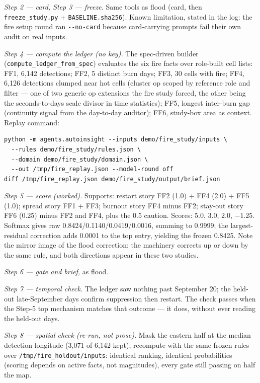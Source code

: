 \documentclass[11pt]{article}
\begin{document}
\emph{Step 2 --- card, Step 3 --- freeze.} Same tools as flood (card, then
\verb|freeze_study.py| + \verb|BASELINE.sha256|). Known limitation, stated in
the log: the fire setup round ran \verb|--no-card| because card-carrying
prompts fail their own audit on real inputs.

\emph{Step 4 --- compute the ledger (no key).} The spec-driven builder
(\verb|compute_ledger_from_spec|) evaluates the six fire facts over
role-built cell lists: FF1, 6,142 detections; FF2, 5 distinct burn days; FF3,
30 cells with fire; FF4, 6,126 detections clumped near hot cells (cluster op
scoped by reference role and filter --- one of two generic op extensions the
fire study forced, the other being the seconds-to-days scale divisor in
time statistics); FF5, longest inter-burn gap (continuity signal from the
day-to-day auditor); FF6, study-box area as context. Replay command:
{\footnotesize
\begin{verbatim}
python -m agents.autoinsight --inputs demo/fire_study/inputs \
  --rules demo/fire_study/rules.json \
  --domain demo/fire_study/domain.json \
  --out /tmp/fire_replay.json --model-round off
diff /tmp/fire_replay.json demo/fire_study/output/brief.json
\end{verbatim}
}

\emph{Step 5 --- score (worked).} Supports: restart story FF2 (1.0) + FF4
(2.0) + FF5 (1.0); spread story FF1 + FF3; burnout story FF4 minus FF2;
stay-out story FF6 (0.25) minus FF2 and FF4, plus the 0.5 caution. Scores:
$5.0$, $3.0$, $2.0$, $-1.25$. Softmax gives raw
0.8424/0.1140/0.0419/0.0016, summing to 0.9999; the largest-residual
correction adds 0.0001 to the top entry, yielding the frozen 0.8425. Note
the mirror image of the flood correction: the machinery corrects up or down
by the same rule, and both directions appear in these two studies.

\emph{Step 6 --- gate and brief,} as flood.

\emph{Step 7 --- temporal check.} The ledger saw nothing past September 20;
the held-out late-September days confirm suppression then restart. The check
passes when the Step-5 top mechanism matches that outcome --- it does,
without ever reading the held-out days.

\emph{Step 8 --- spatial check (re-run, not prose).} Mask the eastern half at
the median detection longitude (3,071 of 6,142 kept), recompute with the same
frozen rules over \verb|/tmp/fire_holdout/inputs|: identical ranking,
identical probabilities (scoring depends on active facts, not magnitudes),
every gate still passing on half the map.
\end{document}
